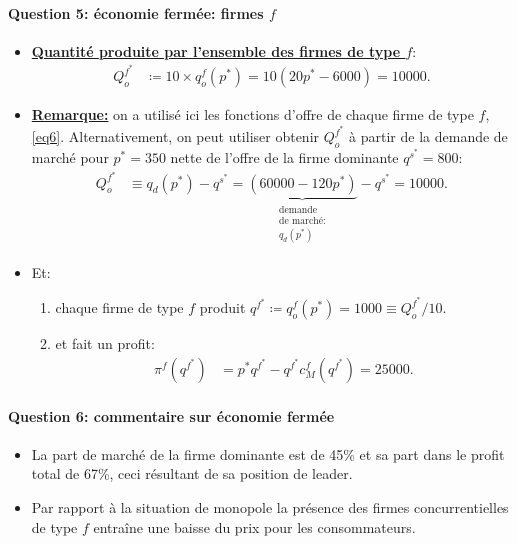 \documentclass[notes, ignorenonframetext, compress, 9pt, xcolor=svgnames, aspectratio=169]{beamer}
\begin{document}
  \begin{frame}[allowframebreaks]{\insertsection}
   \framesubtitle{Question 5: économie fermée: firmes $f$}
  \begin{itemize}
  \item \underline{\textbf{Quantité produite par l'ensemble des firmes de type $f$}}:
  \begin{align*}
  Q^{f^*}_o &\coloneqq 10\times q^f_o(p^*) = 10(20p^* - 6000) = 10000.
  \end{align*}
  \item \underline{\textbf{Remarque:}} on a utilisé ici les fonctions d'offre de chaque firme de type $f$, \eqref{eq6}. Alternativement, on peut utiliser
  obtenir $Q^{f^*}_o$ à partir de la demande de marché pour $p^* = 350$ nette de l'offre de la firme dominante $q^{s^*} = 800$:
  \begin{align*}
   Q^{f^*}_o &\equiv q_d(p^*) - q^{s^*}= \underbrace{(60000 - 120p^*)}_{\substack{\text{demande} \\ \text{de marché:} \\ q_d(p^*) }} - q^{s^*} = 10000.
  \end{align*}
  \item Et:
  \begin{enumerate}[$\cdot$]
  \item chaque firme de type $f$ produit $q^{f^*} \coloneqq q_o^f(p^*) = 1000 \equiv Q^{f^*}_o/10$.
  \item et fait un profit:
  \begin{align*}
  \pi^f(q^{f^*}) &= p^*q^{f^*} - q^{f^*} c_M^f(q^{f^*})  = 25000.
  \end{align*}
  \end{enumerate}
  \end{itemize}
  \end{frame}
  
  \begin{frame}[allowframebreaks]{\insertsection}
   \framesubtitle{Question 6: commentaire sur  économie fermée}
  \begin{itemize}
  \item La part de marché de la firme dominante est de 45\% et sa part dans le profit total de 67\%, ceci résultant de sa position de leader.
  \item Par rapport à la situation de monopole la présence des firmes concurrentielles de type $f$ entraîne une baisse du prix pour les consommateurs.
    \end{itemize}
  \end{frame}
  
\end{document}
